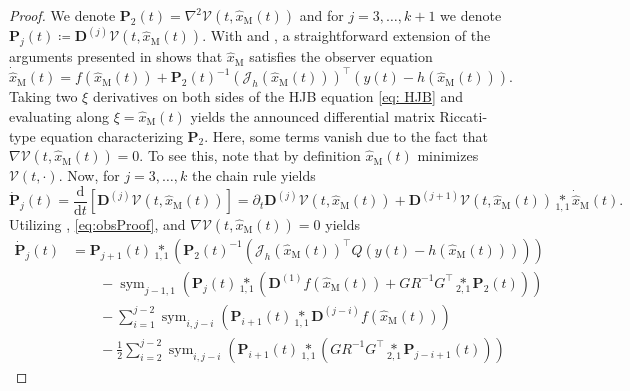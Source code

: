 \documentclass[11pt,reqno]{amsart}
\numberwithin{equation}{section}
\theoremstyle{plain}
\DeclareMathOperator{\Sym}{sym}
\newcommand{\tenp}[2]{\underset{#1,#2}{*}}
\newcommand{\TenDeriv}[1]{\mathbf{D}^{(#1)}}
\begin{document}
\begin{proof}
We denote $\mathbf{P}_2(t) = \nabla^2 \mathcal{V}(t,\widehat{x}_\mathrm{M}(t))$ and for $j=3,\dots,k+1$ we denote $ \mathbf{P}_j(t)\coloneqq\TenDeriv{j} \mathcal{V}(t,\widehat{x}_\mathrm{M}(t)) $. 
With  and , a straightforward extension of the arguments presented in \cite[Sec.~2.1]{BreKu21} shows that $\widehat{x}_\mathrm{M}$ satisfies the observer equation 
%
\begin{equation}\label{eq:obsProof}
    \dot{\widehat{x}}_\mathrm{M}(t) 
        = f(\widehat{x}_{\mathrm{M}}(t)) + \mathbf{P}_2(t)^{-1} (\mathcal{J}_h(\widehat{x}_{\mathrm{M}}(t)))^\top  (y(t) - h(\widehat{x}_{\mathrm{M}}(t))).
\end{equation}
%
Taking two $\xi$ derivatives on both sides of the HJB equation \eqref{eq: HJB} and evaluating along $\xi = \widehat{x}_{\mathrm{M}}(t)$ yields the announced differential matrix Riccati-type equation characterizing $\mathbf{P}_2$. Here, some terms vanish due to the fact that $\nabla \mathcal{V}(t,\widehat{x}_{\mathrm{M}}(t))=0$. To see this, note that by definition $\widehat{x}_\mathrm{M}(t)$ minimizes $\mathcal{V}(t,\cdot)$.
Now, for $j=3,\dots,k$ the chain rule yields 
%
\begin{equation*}
    \dot{ \mathbf{P}}_j(t)
    =
   \frac{\mathrm{d}}{\mathrm{d}t} \left[ \TenDeriv{j} \mathcal{V}(t,\widehat{x}_{\mathrm{M}}(t)) \right]
    =
    \partial_t  \TenDeriv{j} \mathcal{V}(t,\widehat{x}_{\mathrm{M}}(t)) + \TenDeriv{j+1} \mathcal{V}(t,\widehat{x}_{\mathrm{M}}(t)) \tenp{1}{1} \dot{\widehat{x}}_{\mathrm{M}}(t).
\end{equation*}
%
Utilizing , \eqref{eq:obsProof}, and $\nabla \mathcal{V}(t,\widehat{x}_{\mathrm{M}}(t))=0$ yields 
%
\begin{align*}
    \dot{\mathbf{P}}_j(t) 
    &= \mathbf{P}_{j+1}(t) \tenp{1}{1} \left(\mathbf{P}_2(t)^{-1} \left(\mathcal{J}_h(\widehat{x}_{\mathrm{M}}(t))^\top Q\left(y(t) - h(\widehat{x}_{\mathrm{M}}(t))\right)\right)\right) 
    \\
    &\qquad  - \Sym_{j-1,1}\left( \mathbf{P}_{j}(t)  \tenp{1}{1} \left( \TenDeriv{1}f(\widehat{x}_{\mathrm{M}}(t))+  G R^{-1}G^\top \tenp{2}{1}\mathbf{P}_{2}(t)  \right) \right)
    \\
    &\qquad -\sum_{i=1}^{j-2} \Sym_{i,j-i}\left( \mathbf{P}_{i+1}(t)  \tenp{1}{1}\TenDeriv{j-i}f(\widehat{x}_{\mathrm{M}}(t)) \right)
    \\
    &\qquad - \frac{1}{2}\sum_{i=2}^{j-2} \Sym_{i,j-i}\left( \mathbf{P}_{i+1} (t) \tenp{1}{1} \left( G R^{-1} G^\top \tenp{2}{1}\mathbf{P}_{j-i+1} (t) \right) \right)

\end{align*}
\end{proof}
\end{document}
